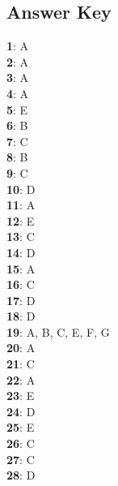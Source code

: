 \documentclass{exam}
\begin{document}
\begin{questions}
\section*{Answer Key}
    \textbf{1}: A \\
    \textbf{2}: A \\
    \textbf{3}: A \\
    \textbf{4}: A \\
    \textbf{5}: E \\
    \textbf{6}: B \\
    \textbf{7}: C \\
    \textbf{8}: B \\
    \textbf{9}: C \\
    \textbf{10}: D \\
    \textbf{11}: A \\
    \textbf{12}: E \\
    \textbf{13}: C \\
    \textbf{14}: D \\
    \textbf{15}: A \\
    \textbf{16}: C \\
    \textbf{17}: D \\
    \textbf{18}: D \\
    \textbf{19}: A, B, C, E, F, G \\
    \textbf{20}: A \\
    \textbf{21}: C \\
    \textbf{22}: A \\
    \textbf{23}: E \\
    \textbf{24}: D \\
    \textbf{25}: E \\
    \textbf{26}: C \\
    \textbf{27}: C \\
    \textbf{28}: D \\
    
\end{questions}
\end{document}
